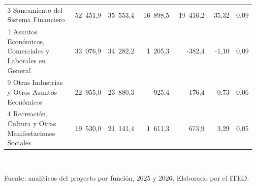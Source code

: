 \begin{table}[htbp]
\begin{tabular}{p{4.6cm}rrrrrr}
3 Saneamiento del Sistema Financiero & 52 451,9 & 35 553,4 & -16 898,5 & -19 416,2 & -35,32 & 0,09 \\
1 Asuntos Económicos, Comerciales y Laborales en General & 33 076,9 & 34 282,2 & 1 205,3 & -382,4 & -1,10 & 0,09 \\
9 Otras Industrias y Otros Asuntos Económicos & 22 955,0 & 23 880,3 & 925,4 & -176,4 & -0,73 & 0,06 \\
4 Recreación, Cultura y Otras Manifestaciones Sociales & 19 530,0 & 21 141,4 & 1 611,3 & 673,9 & 3,29 & 0,05 \\
\bottomrule
\end{tabular}
\\[2pt]\begin{minipage}{0.92\textwidth}\scriptsize Fuente: analíticos del proyecto por función, 2025 y 2026. Elaborado por el ITED.\end{minipage}
\end{table}
